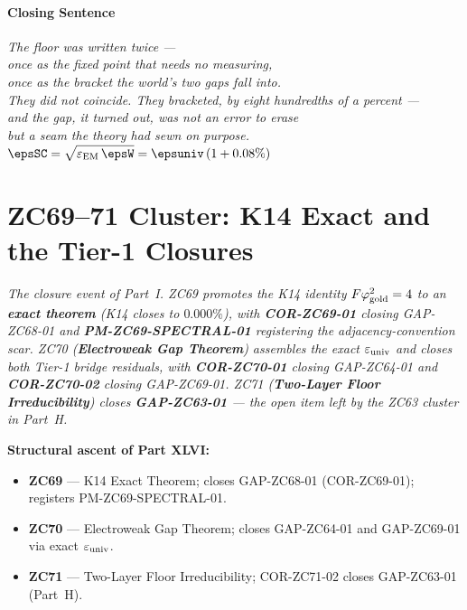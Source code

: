 \documentclass[12pt, a4paper]{article}
\renewcommand{\epsEM}{\varepsilon_{\rm EM}}
\begin{document}
\subsection{Closing Sentence}

\bigskip
\begin{center}
\textit{%
  The floor was written twice ---\\[0.3em]
  once as the fixed point that needs no measuring,\\[0.3em]
  once as the bracket the world's two gaps fall into.\\[0.5em]
  They did not coincide. They bracketed, by eight hundredths of a percent ---\\[0.3em]
  and the gap, it turned out, was not an error to erase\\[0.3em]
  but a seam the theory had sewn on purpose.\\[0.5em]
  $\displaystyle \epsSC=\sqrt{\epsEM\,\epsW}=\epsuniv\,(1+0.08\%)$
}
\end{center}




\part{ZC69--71 Cluster: K14 Exact and the Tier-1 Closures}
\label{part:zc69-71}

\noindent
\textit{The closure event of Part~I. ZC69 promotes the K14 identity
$F\varphi_{\rm gold}^2=4$ to an \textbf{exact theorem} (K14 closes
to $0.000\%$), with \textbf{COR-ZC69-01} closing GAP-ZC68-01 and
\textbf{PM-ZC69-SPECTRAL-01} registering the adjacency-convention
scar. ZC70 (\textbf{Electroweak Gap Theorem}) assembles the exact
$\varepsilon_{\rm univ}$ and closes both Tier-1 bridge residuals,
with \textbf{COR-ZC70-01} closing GAP-ZC64-01 and
\textbf{COR-ZC70-02} closing GAP-ZC69-01. ZC71 (\textbf{Two-Layer
Floor Irreducibility}) closes \textbf{GAP-ZC63-01} --- the open
item left by the ZC63 cluster in Part~H.}

\medskip
\textbf{Structural ascent of Part XLVI:}
\begin{itemize}[leftmargin=1.5em]
\item \textbf{ZC69} --- K14 Exact Theorem; closes GAP-ZC68-01 (COR-ZC69-01); registers PM-ZC69-SPECTRAL-01.
\item \textbf{ZC70} --- Electroweak Gap Theorem; closes GAP-ZC64-01 and GAP-ZC69-01 via exact $\varepsilon_{\rm univ}$.
\item \textbf{ZC71} --- Two-Layer Floor Irreducibility; COR-ZC71-02 closes GAP-ZC63-01 (Part~H).
\end{itemize}
\end{document}
